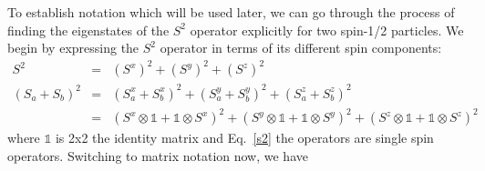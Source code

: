 To establish notation which will be used later, we can go through the process of finding the eigenstates of the $S^2$ operator explicitly for 
two spin-1/2 particles.  We begin by expressing the $S^2$ operator in terms of its different
spin components:
\begin{eqnarray}
S^2 &=& (S^x)^2 + (S^y)^2 + (S^z)^2 \\
(S_a + S_b)^2 &=& (S^x_a+S^x_b)^2 + (S^y_a+S^y_b)^2 + (S^z_a+S^z_b)^2 \nonumber \\
			&=&(S^x\otimes \mathds{1}+\mathds{1} \otimes S^x)^2 + 
			(S^y\otimes \mathds{1}+\mathds{1}\otimes S^y)^2 + (S^z\otimes\mathds{1}+\mathds{1}\otimes S^z)^2
			\label{s2}
\end{eqnarray}
where $\mathds{1}$ is 2x2 the identity matrix and Eq.~\eqref{s2} the operators are single spin operators.
Switching to matrix notation now, we have
